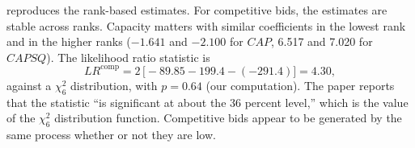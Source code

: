 reproduces the rank-based estimates. For competitive bids, the estimates are stable across
ranks. Capacity matters with similar coefficients in the lowest rank and in the higher ranks ($-1.641$ and $-2.100$
for $\mathit{CAP}$, 6.517 and 7.020 for $\mathit{CAPSQ}$). The likelihood ratio statistic is
\begin{equation*}
  LR^{\mathrm{comp}} = 2\,\bigl[-89.85 - 199.4 - (-291.4)\bigr] = 4.30 ,
\end{equation*}
against a $\chi^2_6$ distribution, with $p = 0.64$ (our computation). The paper reports that the statistic ``is
significant at about the 36 percent level,'' which is the value of the $\chi^2_6$ distribution function. Competitive
bids appear to be generated by the same process whether or not they are low.

